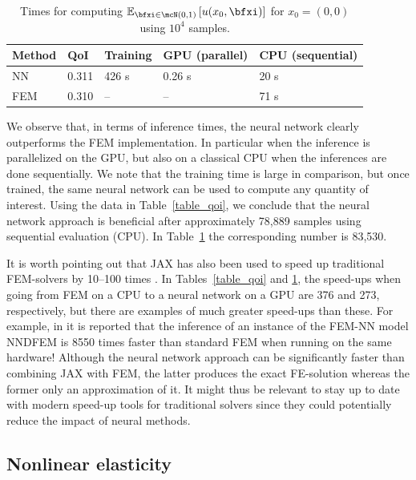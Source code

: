 \documentclass[12pt]{article}
\begin{document}
\begin{table}[h!]
	\caption{Times for computing $\mathbb{E}_{\bfxi \in \mcN(0,1)}\left[u(x_0,\bfxi)\right]$ for $x_0 = (0,0)$ using $10^4$ samples.}
	\centering
	\begin{tabular}{|l|l|l|l|l|}
		\hline
		Method & QoI & Training & GPU (parallel) & CPU (sequential)  \\ \hline
		NN & 0.311 & 426 s & 0.26 s & 20 s\\ \hline
		FEM & 0.310 & -- &-- &71 s \\ \hline
	\end{tabular}\label{table_qoi_point}
\end{table}

We observe that, in terms of inference times, the neural network clearly outperforms the FEM implementation. In particular when the inference is parallelized on the GPU, but also on a classical CPU when the inferences are done sequentially. We note that the training time is large in comparison, but once trained, the same neural network can be used to compute any quantity of interest. Using the data in Table~\ref{table_qoi}, we conclude that the neural network approach is beneficial after approximately 78,889 samples using sequential evaluation (CPU). In Table~\ref{table_qoi_point} the corresponding number is 83,530.

It is worth pointing out that JAX has also been used to speed up traditional FEM-solvers by 10--100 times \cite{XUE2023108802, JAXCPFEM, TOUTLINI2026109866}. In Tables~\ref{table_qoi} and \ref{table_qoi_point}, the speed-ups when going from FEM on a CPU to a neural network on a GPU are 376 and 273, respectively, but there are examples of much greater speed-ups than these. For example, in \cite{WANG2025109783} it is reported that the inference of an instance of the FEM-NN model NNDFEM is 8550 times faster than standard FEM when running on the same hardware! Although the neural network approach can be significantly faster than combining JAX with FEM, the latter produces the exact FE-solution whereas the former only an approximation of it. It might thus be relevant to stay up to date with modern speed-up tools for traditional solvers since they could potentially reduce the impact of neural methods.

\subsection{Nonlinear elasticity} \label{sec_nonlinelast}
\end{document}
